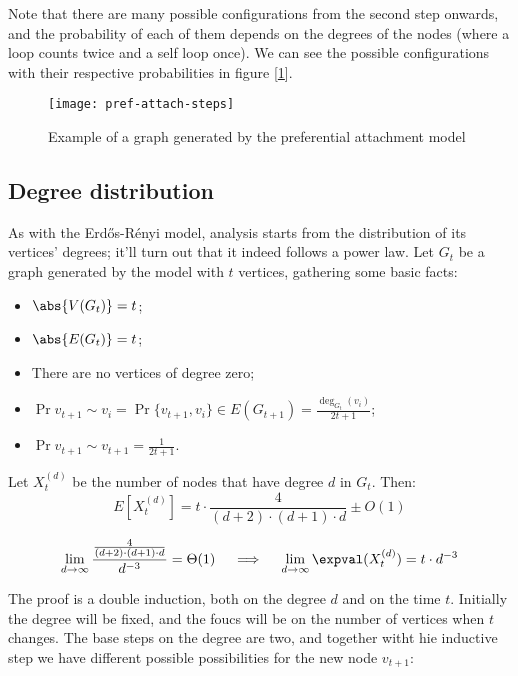 Note that there are many possible configurations from the second step onwards, and the probability of each of them depends on the degrees of the nodes (where a loop counts twice and a self loop once). We can see the possible configurations with their respective probabilities in figure [\ref{fig:pref-att-steps}].

\begin{figure}[ht]
    \centering
    \texttt{[image: pref-attach-steps]}
    \caption{Example of a graph generated by the preferential attachment model}
    \label{fig:pref-att-steps}
\end{figure}


\subsection{Degree distribution}\label{sec:pref-attach-degree}

As with the Erd\H{o}s-Rényi model, analysis starts from the distribution of its vertices' degrees; it'll turn out that it indeed follows a power law. Let $G_t$ be a graph generated by the model with $t$ vertices, gathering some basic facts:
       
\begin{itemize}
    \item $\abs{V(G_t)} = t$;
    \item $\abs{E(G_t)} = t$;
    \item There are no vertices of degree zero;
    \item $\Pr{v_{t + 1} \sim v_i} = \Pr{\{v_{t  +1}, v_i\} \in E(G_{t + 1})} = \frac{\deg_{G_t}(v_i)}{2t + 1}$;
    \item $\Pr{v_{t + 1} \sim v_{t + 1}} = \frac{1}{2t + 1}$.
\end{itemize}
    
\begin{thm}\label{thm:pref-attach-degree}
    Let $X_t^{(d)}$ be the number of nodes that have degree $d$ in $G_t$. Then:
        \[
        E\left[X_t^{\left(d\right)}\right] = t \cdot \frac{4}{(d+2) \cdot (d+1) \cdot d} \pm O(1)
        \]
\end{thm}
    
\obs \[\lim_{d \to \infty} \frac{\frac{4}{(d+2) \cdot (d+1) \cdot d}}{d^{-3}} = \Theta(1) \quad \implies \quad \lim_{d \to \infty} \expval(X_t^{(d)}) = t \cdot d^{-3}\]
    
The proof is a double induction, both on the degree $d$ and on the time $t$. Initially the degree will be fixed, and the foucs will be on the number of vertices when $t$ changes. The base steps on the degree are two, and together witht hie inductive step we have different possible possibilities for the new node $v_{t + 1}$:

